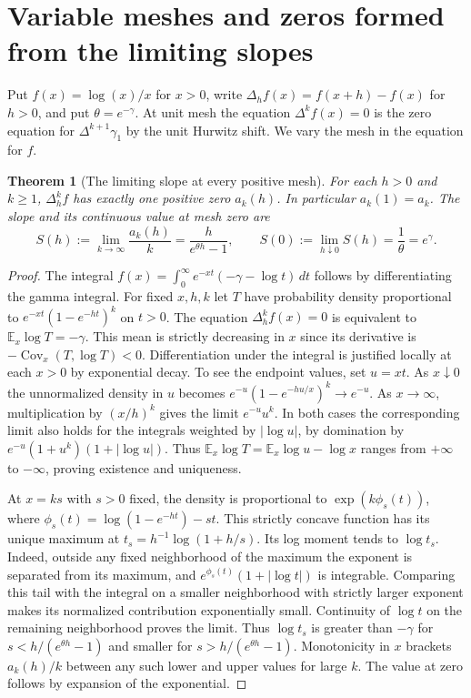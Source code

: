 \documentclass[11pt,a4paper]{article}
\newtheorem{theorem}{Theorem}[section]
\theoremstyle{definition}\newtheorem{definition}[theorem]{Definition}\newtheorem{example}[theorem]{Example}
\theoremstyle{remark}\newtheorem{remark}[theorem]{Remark}
\begin{document}
\section{Variable meshes and zeros formed from the limiting slopes}
\label{sec:rev-slopes}

Put $f(x)=\log(x)/x$ for $x>0$, write $\Delta_h f(x)=f(x+h)-f(x)$ for $h>0$, and put $\theta=e^{-\gamma}$. At unit mesh the equation $\Delta^k f(x)=0$ is the zero equation for $\Delta^{k+1}\gamma_1$ by the unit Hurwitz shift. We vary the mesh in the equation for $f$.

\begin{theorem}[The limiting slope at every positive mesh]
\label{thm:rev-mesh}
For each $h>0$ and $k\ge1$, $\Delta_h^k f$ has exactly one positive zero $a_k(h)$. In particular $a_k(1)=a_k$. The slope and its continuous value at mesh zero are
\[
 S(h):=\lim_{k\to\infty}\frac{a_k(h)}{k}
       =\frac{h}{e^{\theta h}-1},\qquad
 S(0):=\lim_{h\downarrow0}S(h)=\frac1\theta=e^\gamma .
\]
\end{theorem}
\begin{proof}
The integral $f(x)=\int_0^\infty e^{-xt}(-\gamma-\log t)\,dt$ follows by differentiating the gamma integral. For fixed $x,h,k$ let $T$ have probability density proportional to $e^{-xt}(1-e^{-ht})^k$ on $t>0$. The equation $\Delta_h^k f(x)=0$ is equivalent to $\mathbb E_x\log T=-\gamma$. This mean is strictly decreasing in $x$ since its derivative is $-\operatorname{Cov}_x(T,\log T)<0$. Differentiation under the integral is justified locally at each $x>0$ by exponential decay. To see the endpoint values, set $u=xt$. As $x\downarrow0$ the unnormalized density in $u$ becomes $e^{-u}(1-e^{-hu/x})^k\to e^{-u}$. As $x\to\infty$, multiplication by $(x/h)^k$ gives the limit $e^{-u}u^k$. In both cases the corresponding limit also holds for the integrals weighted by $|\log u|$, by domination by $e^{-u}(1+u^k)(1+|\log u|)$. Thus $\mathbb E_x\log T=\mathbb E_x\log u-\log x$ ranges from $+\infty$ to $-\infty$, proving existence and uniqueness.

At $x=ks$ with $s>0$ fixed, the density is proportional to
$\exp(k\phi_s(t))$, where $\phi_s(t)=\log(1-e^{-ht})-st$. This strictly concave function has its unique maximum at $t_s=h^{-1}\log(1+h/s)$. Its log moment tends to $\log t_s$. Indeed, outside any fixed neighborhood of the maximum the exponent is separated from its maximum, and $e^{\phi_s(t)}(1+|\log t|)$ is integrable. Comparing this tail with the integral on a smaller neighborhood with strictly larger exponent makes its normalized contribution exponentially small. Continuity of $\log t$ on the remaining neighborhood proves the limit. Thus $\log t_s$ is greater than $-\gamma$ for $s<h/(e^{\theta h}-1)$ and smaller for $s>h/(e^{\theta h}-1)$. Monotonicity in $x$ brackets $a_k(h)/k$ between any such lower and upper values for large $k$. The value at zero follows by expansion of the exponential.
\end{proof}
\end{document}
